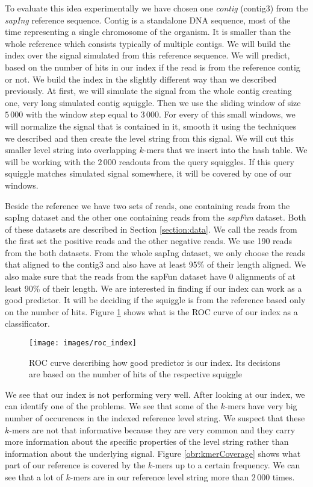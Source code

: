 To evaluate this idea experimentally we have chosen one \textit{contig} (contig3) from the
\textit{sapIng} reference sequence.
Contig is a standalone DNA sequence, most of the time representing a single chromosome
of the organism. It is smaller than the whole reference which consists typically of multiple contigs.
We will build the index over the signal simulated from this reference sequence. We will predict,
based on the number of hits in our index if the read is from the reference contig
or not. We build the index in the slightly different way than we described previously.
At first, we will simulate the signal from the whole contig creating one, very long simulated contig squiggle.
Then we use the sliding window of size $5\,000$ with the window step equal to $3\,000$.
For every of this small windows, we will normalize the signal that is contained in it, smooth
it using the techniques we described and then create the level string from this signal.
We will cut this smaller level string into overlapping $k$-mers that we insert into the
hash table. We will be working with the $2\,000$ readouts from the query squiggles. If this
query squiggle matches simulated signal somewhere, it will be covered by one of our windows.

Beside the reference we have two sets of reads, one containing reads from the sapIng
dataset and the other one containing reads from the \textit{sapFun} dataset. Both of these datasets
are described in Section \ref{section:data}. We call the reads from the first set the
positive reads and the other negative reads. We use 190 reads from the both datasets.
From the whole sapIng dataset, we only choose the reads that aligned to the contig3
and also have at least 95\% of their length aligned. We also make sure
that the reads from the sapFun dataset have 0 alignments of at least 90\% of their length. 
We are interested in finding if our index can work as a good predictor. It will be
deciding if the squiggle is from the reference based only on the number of hits.
Figure \ref{obr:roc_index} shows what is the ROC curve of our index as a classificator.

\begin{figure}
\centerline{\texttt{[image: images/roc\_index]}}
\caption[TODO]{ROC curve describing how good predictor is our index. Its decisions
are based on the number of hits of the respective squiggle}
\label{obr:roc_index}
\end{figure}

We see that our index is not performing very well. After looking at our index, we can
identify one of the problems. We see that some of the $k$-mers have very big number of occurences in the indexed
reference level string. We suspect that these $k$-mers are not that informative
because they are very common and they carry more information about the specific
properties of the level string rather than information about the underlying signal.
Figure \ref{obr:kmerCoverage} shows what part of our reference is covered by the $k$-mers
up to a certain frequency. We can see that a lot of $k$-mers are in our reference
level string more than $2\,000$ times.

